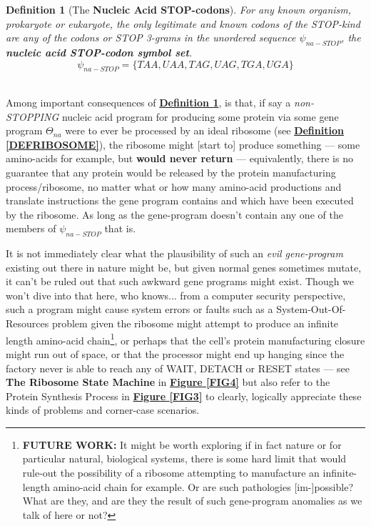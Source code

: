 \documentclass[a4paper, 18pt]{book} %
\newtheorem{defn}{Definition}
\begin{document}
\begin{defn}[The \textbf{Nucleic Acid STOP-codons}]
\label{DEFSTOPCOD}
For any known organism, prokaryote or eukaryote, the only legitimate and known codons of the STOP-kind are any of the codons or STOP 3-grams in the unordered sequence $\psi_{na-STOP}$, the \textbf{nucleic acid STOP-codon symbol set}.\\

\begin{equation}
\label{EQNNASSSTOP}
\psi_{na-STOP} = \{TAA,UAA,TAG,UAG,TGA,UGA\}
\end{equation}\\
\end{defn} 

Among important consequences of \textbf{\hyperref[DEFSTOPCOD]{Definition \ref{DEFSTOPCOD}}}, is that, if say a \textit{non-STOPPING} nucleic acid program for producing some protein via some gene program $\Theta_{na}$ were to ever be processed by an ideal ribosome (see \textbf{\hyperref[DEFRIBOSOME]{Definition \ref{DEFRIBOSOME}}}), the ribosome might [start to] produce something --- some amino-acids for example, but \textbf{would never return} --- equivalently, there is no guarantee that any protein would be released by the protein manufacturing process/ribosome, no matter what or how many amino-acid productions and translate instructions the gene program contains and which have been executed by the ribosome. As long as the gene-program doesn't contain any one of the members of $\psi_{na-STOP}$ that is.

It is not immediately clear what the plausibility of such an \textit{evil gene-program} existing out there in nature might be, but given normal genes sometimes mutate\cite{gregory1987oxford}, it can't be ruled out that such awkward gene programs might exist. Though we won't dive into that here, who knows... from a computer security perspective, such a program might cause system errors or faults such as a System-Out-Of-Resources problem given the ribosome might attempt to produce an infinite length amino-acid chain\footnote{\textbf{FUTURE WORK:} It might be worth exploring if in fact nature or for particular natural, biological systems, there is some hard limit that would rule-out the possibility of a ribosome attempting to manufacture an infinite-length amino-acid chain for example. Or are such pathologies [im-]possible? What are they, and are they the result of such gene-program anomalies as we talk of here or not?}, or perhaps that the cell's protein manufacturing closure might run out of space, or that the processor might end up hanging since the factory never is able to reach any of WAIT, DETACH or RESET states --- see \textbf{The Ribosome State Machine} in \textbf{\hyperref[FIG4]{Figure \ref{FIG4}}} but also refer to the Protein Synthesis Process in \textbf{\hyperref[FIG3]{Figure \ref{FIG3}}} to clearly, logically appreciate these kinds of problems and corner-case scenarios. 
\end{document}
